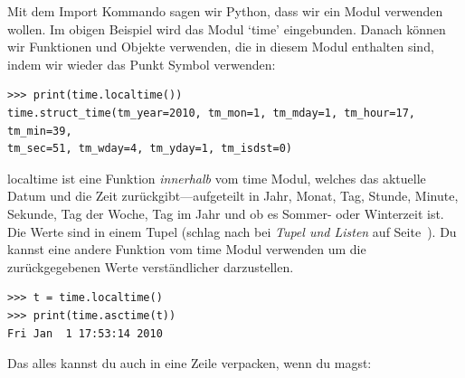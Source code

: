 Mit dem Import Kommando sagen wir Python, dass wir ein Modul verwenden wollen. Im obigen Beispiel wird das Modul `time' eingebunden. Danach können wir Funktionen und Objekte verwenden, die in diesem Modul enthalten sind, indem wir wieder das Punkt Symbol verwenden:

\begin{Verbatim}[frame=single]
>>> print(time.localtime())
time.struct_time(tm_year=2010, tm_mon=1, tm_mday=1, tm_hour=17, tm_min=39, 
tm_sec=51, tm_wday=4, tm_yday=1, tm_isdst=0)
\end{Verbatim}

localtime ist eine Funktion \emph{innerhalb} vom time Modul, welches das aktuelle Datum und die Zeit zurückgibt---aufgeteilt in Jahr, Monat, Tag, Stunde, Minute, Sekunde, Tag der Woche, Tag im Jahr und ob es Sommer- oder Winterzeit ist. Die Werte sind in einem Tupel (schlag nach bei \emph{Tupel und Listen} auf Seite~\pageref{tuplesandlists}). Du kannst eine andere Funktion vom time Modul verwenden um die zurückgegebenen Werte verständlicher darzustellen.

\begin{Verbatim}[frame=single]
>>> t = time.localtime()
>>> print(time.asctime(t))
Fri Jan  1 17:53:14 2010
\end{Verbatim}

\noindent
Das alles kannst du auch in eine Zeile verpacken, wenn du magst:

